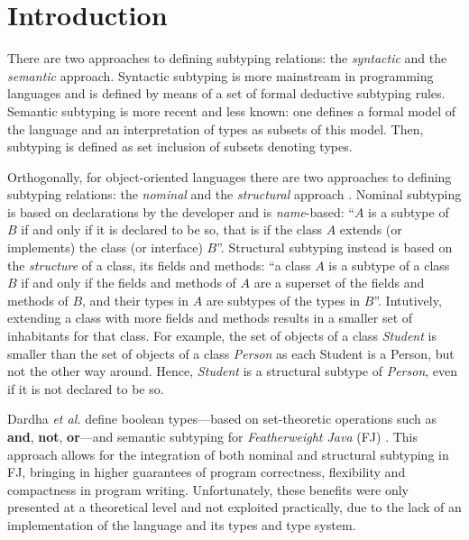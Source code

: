 \documentclass[runningheads]{llncs}
\begin{document}
\section{Introduction}
There are two approaches to defining subtyping relations: the \emph{syntactic} and the \emph{semantic} approach.
Syntactic subtyping \cite{Liskov1994} is more mainstream in programming languages and is defined by means of a set of formal deductive subtyping rules.
Semantic subtyping \cite{Castagna2005,Cas05,Frisch2008} is more recent and less known:  one defines a formal model of the language and an interpretation of types as subsets of this model. Then, subtyping is defined as set inclusion of subsets denoting types.

Orthogonally, for object-oriented languages there are two approaches to defining subtyping relations: the \emph{nominal} and the \emph{structural} approach \cite{Integrating,Useful}.
Nominal subtyping is based on {declarations} by the developer and is \emph{name}-based: ``$A$ is a subtype of $B$ if and only if it is declared to be so, that is if the class $A$ extends (or implements) the class (or interface) $B$''.
Structural subtyping instead is based on the \emph{structure} of a class, its fields and methods: ``a class $A$ is a subtype of a class $B$ if and only if the fields and methods of $A$ are a superset of the fields and methods of $B$, and their types in $A$ are subtypes of the types in $B$''.
Intutively, extending a class with more fields and methods results in a smaller set of inhabitants for that class. For example, the set of objects of a class \emph{Student} is smaller than the set of objects of a class \emph{Person} as each Student is a Person, but not the other way around. Hence, \emph{Student} is a structural subtype of \emph{Person}, even if it is not declared to be so.


Dardha \emph{et al.} \cite{Dardha2013,Dardha2017} define boolean types---based on set-theoretic operations such as \textbf{and}, \textbf{not}, \textbf{or}---and semantic subtyping for \emph{Featherweight Java} (FJ) \cite{featherweight}.
This approach allows for the integration of both nominal and structural subtyping in FJ, bringing in higher guarantees of program correctness, flexibility and compactness in program writing.
Unfortunately, these benefits were only presented at a theoretical level and not exploited practically, due to the lack of an implementation of the language and its types and type system.
\end{document}
